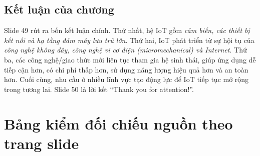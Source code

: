 \subsection{Kết luận của chương}
Slide 49 rút ra bốn kết luận chính. Thứ nhất, hệ IoT gồm \emph{cảm biến, các thiết bị kết nối và hạ tầng đám mây lưu trữ lớn}. Thứ hai, IoT phát triển từ sự hội tụ của \emph{công nghệ không dây, công nghệ vi cơ điện (micromechanical) và Internet}. Thứ ba, các công nghệ/giao thức mới liên tục tham gia hệ sinh thái, giúp ứng dụng dễ tiếp cận hơn, có chi phí thấp hơn, sử dụng năng lượng hiệu quả hơn và an toàn hơn. Cuối cùng, nhu cầu ở nhiều lĩnh vực tạo động lực để IoT tiếp tục mở rộng trong tương lai. Slide 50 là lời kết ``Thank you for attention!''.

\section*{Bảng kiểm đối chiếu nguồn theo trang slide}
\small
